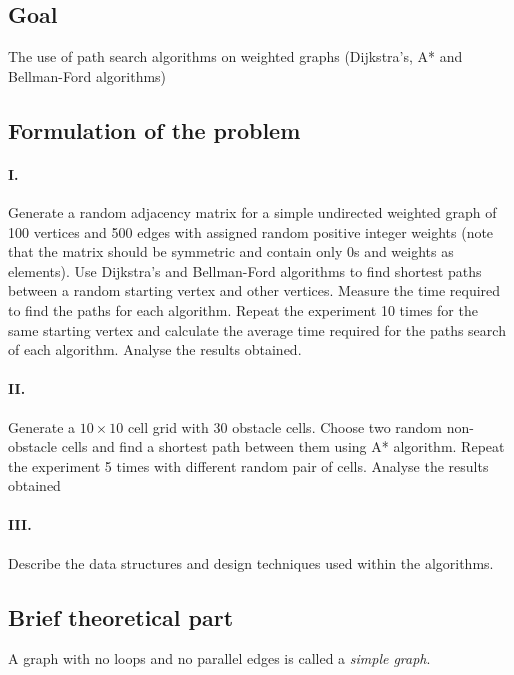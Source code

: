 \newpage
\subsection{Goal}\label{subsec:goal}

The use of path search algorithms on weighted graphs (Dijkstra's, A* and Bellman-Ford algorithms)

\subsection{Formulation of the problem}\label{subsec:formulation-of-the-problem}

\paragraph{I.} Generate a random adjacency matrix for a simple undirected weighted graph of 100 vertices and 500 edges with assigned random positive integer weights (note that the matrix should be symmetric and contain only 0s and weights as elements).
Use Dijkstra's and Bellman-Ford algorithms to find shortest paths between a random starting vertex and other vertices.
Measure the time required to find the paths for each algorithm.
Repeat the experiment 10 times for the same starting vertex and calculate the average time required for the paths search of each algorithm.
Analyse the results obtained.

\paragraph{II.} Generate a $10\times 10$ cell grid with 30 obstacle cells.
Choose two random non-obstacle cells and find a shortest path between them using A* algorithm.
Repeat the experiment 5 times with different random pair of cells.
Analyse the results obtained

\paragraph{III.} Describe the data structures and design techniques used within the algorithms.

\subsection{Brief theoretical part}\label{subsec:brief-theoretical-part}

A graph with no loops and no parallel edges is called a \textit{simple graph}.

